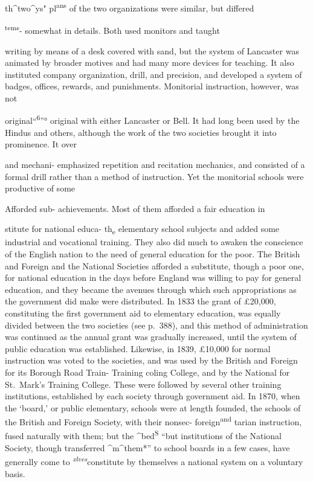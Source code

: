 \documentclass[
]{book}
\begin{document}
th\^{}two\^{}ys" pl\textsuperscript{ans} of the two organizations were similar, but differed

\textsuperscript{tems}- somewhat in details. Both used monitors and taught

writing by means of a desk covered with sand, but the system of Lancaster was animated by broader motives and had many more devices for teaching. It also instituted company organization, drill, and precision, and developed a system of badges, offices, rewards, and punishments. Monitorial instruction, however, was not

original``\textsuperscript{6}''° original with either Lancaster or Bell. It had long been used by the Hindus and others, although the work of the two societies brought it into prominence. It over

and mechani- emphasized repetition and recitation mechanics, and consisted of a formal drill rather than a method of instruction. Yet the monitorial schools were productive of some

Afforded sub- achievements. Most of them afforded a fair education in

stitute for national educa- th\textsubscript{e} elementary school subjects and added some industrial and vocational training. They also did much to awaken the conscience of the English nation to the need of general education for the poor. The British and Foreign and the National Societies afforded a substitute, though a poor one, for national education in the days before England was willing to pay for general education, and they became the avenues through which such appropriations as the government did make were distributed. In 1833 the grant of £20,000, constituting the first government aid to elementary education, was equally divided between the two societies (see p.~388), and this method of administration was continued as the annual grant was\protect\hypertarget{ch20.xmlux5cux23para.300.1.0.box.144.248.1265.799.q.60}{}{ gradually increased, until the system of public education was established. Likewise, in 1839, £10,000 for normal instruction was voted to the societies, and was used by the British and Foreign for its Borough Road Train- Training coling College, and by the National for St.~Mark's Training College. These were followed by several other training institutions, established by each society through government aid. In 1870, when the `board,' or public elementary, schools were at length founded, the schools of the British and Foreign Society, with their nonsec- foreign\textsuperscript{and} tarian instruction, fused naturally with them; but the \^{}bed\textsuperscript{S} ``but institutions of the National Society, though transferred \^{}m\^{}them*'' to school boards in a few cases, have generally come to \emph{\textsuperscript{xlves}}constitute by themselves a national system on a voluntary basis.}
\end{document}
